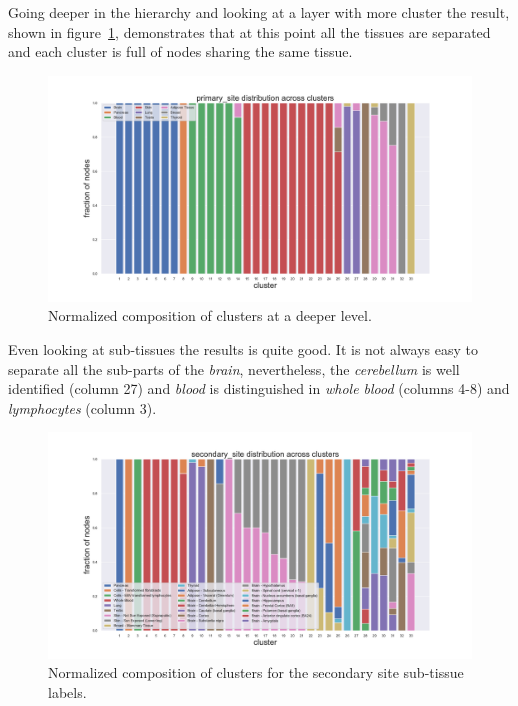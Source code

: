 Going deeper in the hierarchy and looking at a layer with more cluster the result, shown in figure~\ref{fig:topic/gtex/oversigma_10tissue/fraction_clustercomposition_l2_primary_site}, demonstrates that at this point all the tissues are separated and each cluster is full of nodes sharing the same tissue.
\begin{figure}[htb!]
    \centering
    \includegraphics[width=0.9\linewidth]{pictures/topic/gtex/oversigma_10tissue/fraction_clustercomposition_l2_primary_site.pdf}
    \caption{Normalized composition of clusters at a deeper level.}
    \label{fig:topic/gtex/oversigma_10tissue/fraction_clustercomposition_l2_primary_site}
\end{figure}
Even looking at sub-tissues the results is quite good. It is not always easy to separate all the sub-parts of the \textit{brain}, nevertheless, the \textit{cerebellum} is well identified (column 27) and \textit{blood} is distinguished in \textit{whole blood} (columns 4-8) and \textit{lymphocytes} (column 3).
\begin{figure}[htb!]
    \centering
    \includegraphics[width=0.9\linewidth]{pictures/topic/gtex/oversigma_10tissue/fraction_clustercomposition_l2_secondary_site.pdf}
    \caption{Normalized composition of clusters for the secondary site sub-tissue labels.}
    \label{fig:topic/gtex/oversigma_10tissue/fraction_clustercomposition_l2_secondary_site}
\end{figure}

